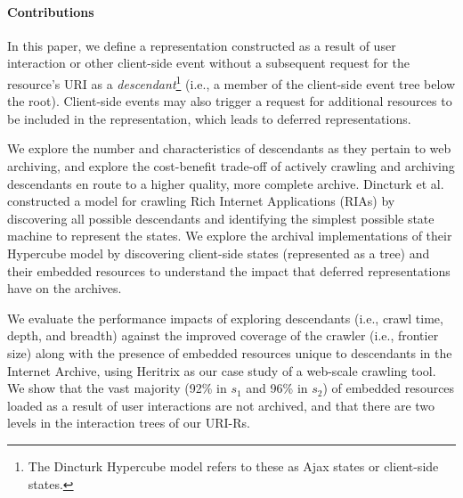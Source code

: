 \documentclass{sig-alternate}
\begin{document}
\paragraph{Contributions}
\label{contributions}

In this paper, we define a representation constructed as a result of user interaction or other client-side event without a subsequent request for the resource's URI as a \emph{descendant}\footnote{The Dincturk Hypercube model refers to these as Ajax states or client-side states.} (i.e., a member of the client-side event tree below the root). Client-side events may also trigger a request for additional resources to be included in the representation, which leads to deferred representations.

We explore the number and characteristics of descendants as they pertain to web archiving, and explore the cost-benefit trade-off of actively crawling and archiving descendants en route to a higher quality, more complete archive. Dincturk et al. \cite{dincturkAjax} constructed a model for crawling Rich Internet Applications (RIAs) by discovering all possible descendants and identifying the simplest possible state machine to represent the states. We explore the archival implementations of their Hypercube model by discovering client-side states (represented as a tree) and their embedded resources to understand the impact that deferred representations have on the archives. %


We evaluate the performance impacts of exploring descendants (i.e., crawl time, depth, and breadth) against the improved coverage of the crawler (i.e., frontier size) along with the presence of embedded resources unique to descendants in the Internet Archive, using Heritrix as our case study of a web-scale crawling tool. We show that the vast majority (92\% in $s_1$ and 96\% in $s_2$) of embedded resources loaded as a result of user interactions are not archived, and that there are two levels in the interaction trees of our URI-Rs.
\end{document}
